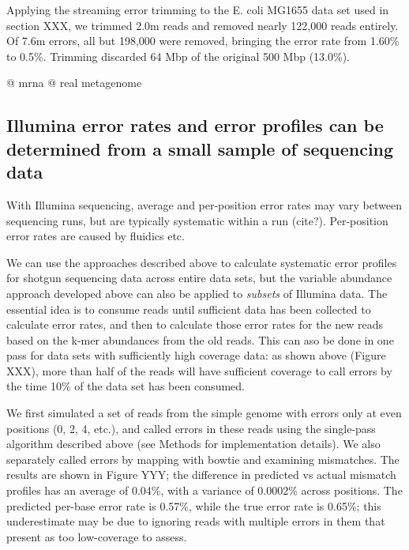 \documentclass{article}
\begin{document}



Applying the streaming error trimming to the E. coli MG1655 data set
used in section XXX, we trimmed 2.0m reads and removed nearly 122,000
reads entirely.  Of 7.6m errors, all but 198,000 were removed,
bringing the error rate from 1.60\% to 0.5\%.  Trimming discarded 64
Mbp of the original 500 Mbp (13.0\%).

@ mrna
@ real metagenome

\subsection{Illumina error rates and error profiles can be determined from a
small sample of sequencing data}

With Illumina sequencing, average and per-position error rates may
vary between sequencing runs, but are typically systematic within a
run (cite?).  Per-position error rates are caused by fluidics etc.

We can use the approaches described above to calculate systematic
error profiles for shotgun sequencing data across entire data sets,
but the variable abundance approach developed above can also be
applied to {\em subsets} of Illumina data.  The essential idea is to
consume reads until sufficient data has been collected to calculate
error rates, and then to calculate those error rates for the new reads
based on the k-mer abundances from the old reads.  This can aso be
done in one pass for data sets with sufficiently high coverage data:
as shown above (Figure XXX), more than half of the reads will have
sufficient coverage to call errors by the time 10\% of the data set
has been consumed.

We first simulated a set of reads from the simple genome with errors
only at even positions (0, 2, 4, etc.), and called errors in these
reads using the single-pass algorithm described above (see Methods for
implementation details).  We also separately called errors by mapping
with bowtie and examining mismatches.  The results are shown in Figure
YYY; the difference in predicted vs actual mismatch profiles has an
average of 0.04\%, with a variance of 0.0002\% across positions.  The
predicted per-base error rate is 0.57\%, while the true error rate is
0.65\%; this underestimate may be due to ignoring reads with multiple
errors in them that present as too low-coverage to assess.
\end{document}
